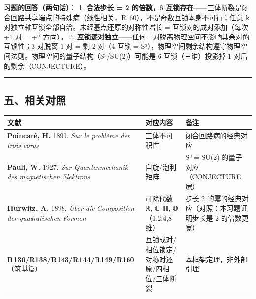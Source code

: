 \documentclass[
]{article}
\newcounter{none} %
\begin{document}
\textbf{习题的回答（两句话）}： 1. \textbf{合法步长 = 2 的倍数，6
互锁存在}------三体断裂是闭合回路共享端点的特殊病（线性相关，R160），不是奇数互锁本身不可行；任意
k 对独立轴互锁全部自洽。未经基点还原的对称性增长 =
互锁对的成对添加（每次 +1 对 = +2 方向）。 2.
\textbf{互锁逐对独立}------任何一对脱离物理空间不影响其余对的互锁性；3
对脱离 1 对 = 剩 2 对（4 互锁 =
S³），物理空间剩余结构遵守物理空间法则。物理空间的量子结构（S³/SU(2)）可能是
6 互锁（三维）投影掉 1 对后的剩余（CONJECTURE）。

\begin{center}\rule{0.5\linewidth}{0.5pt}\end{center}

\subsection{五、相关对照}\label{ux4e94ux76f8ux5173ux5bf9ux7167}

{\def\LTcaptype{none} %
\begin{longtable}[]{@{}
  >{\raggedright\arraybackslash}p{}
  >{\raggedright\arraybackslash}p{}
  >{\raggedright\arraybackslash}p{}@{}}
\toprule\noalign{}
\begin{minipage}[b]{\linewidth}\raggedright
文献
\end{minipage} & \begin{minipage}[b]{\linewidth}\raggedright
对应内容
\end{minipage} & \begin{minipage}[b]{\linewidth}\raggedright
备注
\end{minipage} \\
\midrule\noalign{}
\endhead
\bottomrule\noalign{}
\endlastfoot
\textbf{Poincaré, H.} 1890. \emph{Sur le problème des trois corps} &
三体不可积性 & 闭合回路病的经典对应 \\
\textbf{Pauli, W.} 1927. \emph{Zur Quantenmechanik des magnetischen
Elektrons} & 自旋/泡利矩阵 & S³ = SU(2) 的量子对应（CONJECTURE 层） \\
\textbf{Hurwitz, A.} 1898. \emph{Über die Composition der quadratischen
Formen} & 可除代数 ℝ, ℂ, ℍ, 𝕆（1,2,4,8 维） & 步长 2
的幂的经典对应（对照：本习题证明步长是 2 的倍数更宽） \\
\textbf{R136/R138/R143/R144/R149/R160}（筑基篇） &
互锁成对/相位锁定/对称对还原/四相位/三体断裂 & 本框架定理，非外部引理 \\
\end{longtable}
}
\end{document}
